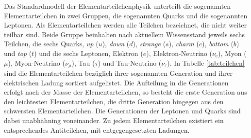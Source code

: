 Das Standardmodell der Elementarteilchenphysik unterteilt die sogenannten Elementarteilchen in zwei Gruppen, die sogenannten Quarks und die sogenannten Leptonen.
Als Elementarteilchen werden alle Teilchen bezeichnet, die nicht weiter teilbar sind.
Beide Gruppe beinhalten nach aktuellem Wissensstand jeweils sechs Teilchen, die sechs Quarks, \textit{up} ($u$), \textit{down} ($d$), \textit{strange} ($s$), \textit{charm} ($c$), \textit{bottom} ($b$) und \textit{top} ($t$) und die sechs Leptonen, Elektron ($e$), Elektron-Neutrino ($\nu_\text{e}$), Myon ($\mu$), Myon-Neutrino ($\nu_{\mu}$), Tau ($\tau$) und Tau-Neutrino ($\nu_{\tau}$).
In Tabelle \ref{tab:teilchen} sind die Elementarteilchen bez\"uglich ihrer sogenannten Generation und ihrer elektrischen Ladung sortiert aufgelistet.
Die Aufteilung in die Generationen erfolgt nach der Masse der Elementarteilchen, so besteht die erste Generation aus den leichtesten Elementarteilchen, die dritte Generation hingegen aus den schwersten Elementarteilchen.
Die Generationen der Leptonen und Quarks sind dabei unabh\"ahning voneinander.
Zu jedem Elementarteilchen existiert ein  entsprechendes Antiteilchen, mit entgegengesetzten Ladungen.

